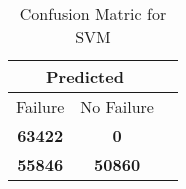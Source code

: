 \begin{table}[] 
\caption{Confusion Matric for SVM} 
\label{Table: Prediction Accuracy-NoneSVMDecisionTrees100EKF-ignoresolarPanelDipole-solarPanelDipole} 
\centering 
\begin{tabular} 
 {@{}ccc@{}} 
\toprule 
\multicolumn{2}{c}{\textbf{Predicted}}
 \\ \midrule 
\multicolumn{1}{|c|}{Failure} & 
\multicolumn{1}{c|}{No Failure}
 \\ \midrule 
\multicolumn{1}{|c|}{\color{green}\textbf{63422}} & 
\multicolumn{1}{c|}{\color{red}\textbf{0}}
 \\ \midrule 
\multicolumn{1}{|c|}{\color{red}\textbf{55846}} & 
\multicolumn{1}{c|}{\color{green}\textbf{50860}}
 \\ \bottomrule 
\end{tabular} 
\end{table} 
